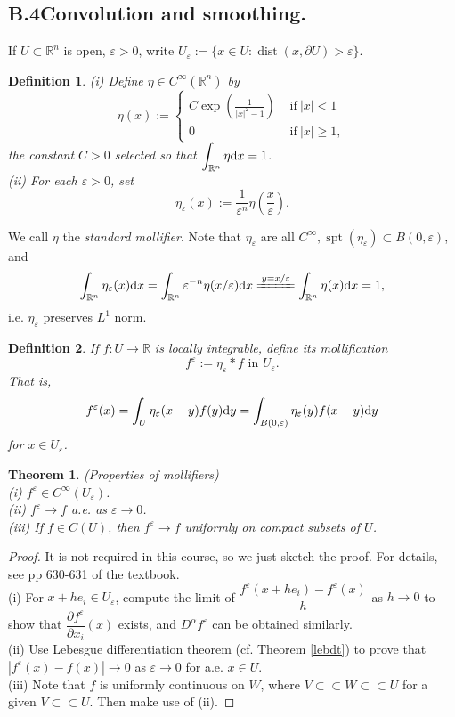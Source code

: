 \documentclass[hyperref,UTF8,12pt]{article}
\numberwithin{equation}{subsection}
\theoremstyle{plain}
\newtheorem{theorem}{Theorem}
\newtheorem{definition}{Definition}
\theoremstyle{definition}
\numberwithin{theorem}{section}
\numberwithin{lemma}{section}
\numberwithin{proposition}{section}
\numberwithin{remark}{section}
\numberwithin{corollary}{section}
\numberwithin{definition}{section}
\numberwithin{problem}{section}
\numberwithin{example}{section}
\def\dif{\textup{d}}
\newcommand{\dis}{\displaystyle}
\newcommand{\ptl}{\partial}
\newcommand{\mr}{\mathbb{R}}
\renewcommand{\geq}{\geqslant}
\newcommand{\spt}{\operatorname{spt}}
\newcommand{\ve}{\varepsilon}
\begin{document}
\begin{appendices}
\subsection*{B.4\quad Convolution and smoothing.}\label{smooth}
If $U\subset\mr^n$ is open, $\ve>0$, write $U_\ve:=\{x\in U:\operatorname{dist}(x,\ptl U)>\ve\}$.
\begin{definition}
\textup{(i)} Define $\eta\in C^\infty(\mr^n)$ by
\[\eta(x):=\begin{cases}C\exp\left(\frac{1}{|x|^2-1}\right)&\text{~if}~|x|<1\\0&\text{~if}~|x|\geq1,\end{cases}\]
the constant $C>0$ selected so that $\dis\int_{\mr^n}\eta\dif x=1$.\\[4pt]
\textup{(ii)} For each $\ve>0$, set
\[\eta_\ve(x):=\frac{1}{\ve^n}\eta\left(\frac{x}{\ve}\right).\]
\end{definition}
We call $\eta$ the \emph{standard mollifier}. Note that $\eta_\ve$ are all $C^\infty,\spt(\eta_\ve)\subset B(0,\ve)$, and\[\int_{\mr^n}\eta_\ve(x)\dif x=\int_ {\mr^n}\ve^{-n}\eta(x/\ve)\dif x\xlongequal{y=x/\ve}\int_{\mr^n}\eta(x)\dif x=1,\]i.e. $\eta_\ve$ preserves $L^1$ norm.
\begin{definition}
If $f:U\to\mr$ is locally integrable, define its mollification\[f^\ve:=\eta_\ve *f\text{~in } U_\ve.\]That is,\[f^\ve(x)=\int_U\eta_\ve(x-y)f(y)\dif y=\int_{B(0,\ve)}\eta_\ve(y)f(x-y)\dif y\]for $x\in U_\ve$.
\end{definition}
\begin{theorem}
(Properties of mollifiers)\\ \textup{(i)} $f^\ve\in C^\infty(U_\ve)$.\\
\textup{(ii)} $f^\ve\to f$ a.e. as $\ve\to0$.\\
\textup{(iii)} If $f \in C(U)$, then $f^\ve\to f$ uniformly on compact subsets of $U$.
\end{theorem}
\begin{proof}
It is not required in this course, so we just sketch the proof. For details, see pp 630-631 of the textbook.\\
(i) For $x+he_i\in U_\ve$, compute the limit of $\dfrac{f^\ve(x+he_i)-f^\ve(x)}{h}$ as $h\to0$ to show that $\dfrac{\ptl f^\ve} {\ptl x_i}(x)$ exists, and $D^\alpha f^\ve$ can be obtained similarly.\\
(ii) Use Lebesgue differentiation theorem (cf. Theorem \ref{lebdt}) to prove that $|f^\ve(x)-f(x)|\to0$ as $\ve\to0$ for a.e. $x\in U$.\\
(iii) Note that $f$ is uniformly continuous on $W$, where $V\subset\subset W\subset\subset U$ for a given $V\subset\subset U$. Then make use of (ii).
\end{proof}



\end{appendices}
\end{document}
